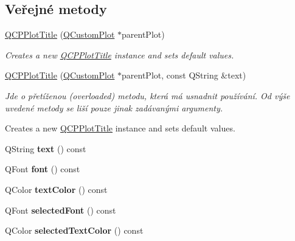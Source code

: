 \subsection*{Veřejné metody}
\begin{DoxyCompactItemize}
\item 
\hyperlink{classQCPPlotTitle_aaae17bee2de6d6a1e695f76fb1abed03}{Q\+C\+P\+Plot\+Title} (\hyperlink{classQCustomPlot}{Q\+Custom\+Plot} $\ast$parent\+Plot)
\begin{DoxyCompactList}\small\item\em Creates a new \hyperlink{classQCPPlotTitle}{Q\+C\+P\+Plot\+Title} instance and sets default values. \end{DoxyCompactList}\item 
\hyperlink{classQCPPlotTitle_a90b9f46ceccbeee41f71c895a8c7ee1f}{Q\+C\+P\+Plot\+Title} (\hyperlink{classQCustomPlot}{Q\+Custom\+Plot} $\ast$parent\+Plot, const Q\+String \&text)
\begin{DoxyCompactList}\small\item\em Jde o přetíženou (overloaded) metodu, která má usnadnit používání. Od výše uvedené metody se liší pouze jinak zadávanými argumenty.

Creates a new \hyperlink{classQCPPlotTitle}{Q\+C\+P\+Plot\+Title} instance and sets default values. \end{DoxyCompactList}\item 
\hypertarget{classQCPPlotTitle_aeaa6f2384a611e8a610262b976b3cee5}{}Q\+String {\bfseries text} () const \label{classQCPPlotTitle_aeaa6f2384a611e8a610262b976b3cee5}

\item 
\hypertarget{classQCPPlotTitle_aa5f4cf007db51ccdd1c137191f564119}{}Q\+Font {\bfseries font} () const \label{classQCPPlotTitle_aa5f4cf007db51ccdd1c137191f564119}

\item 
\hypertarget{classQCPPlotTitle_a69f2cae768ff84dbf9f8a387ad617781}{}Q\+Color {\bfseries text\+Color} () const \label{classQCPPlotTitle_a69f2cae768ff84dbf9f8a387ad617781}

\item 
\hypertarget{classQCPPlotTitle_aa865a3656e01ee8db41837afa892f2a3}{}Q\+Font {\bfseries selected\+Font} () const \label{classQCPPlotTitle_aa865a3656e01ee8db41837afa892f2a3}

\item 
\hypertarget{classQCPPlotTitle_ab2262e40edfc41540c1dbc1c4234f9d2}{}Q\+Color {\bfseries selected\+Text\+Color} () const \label{classQCPPlotTitle_ab2262e40edfc41540c1dbc1c4234f9d2}


\end{DoxyCompactItemize}
